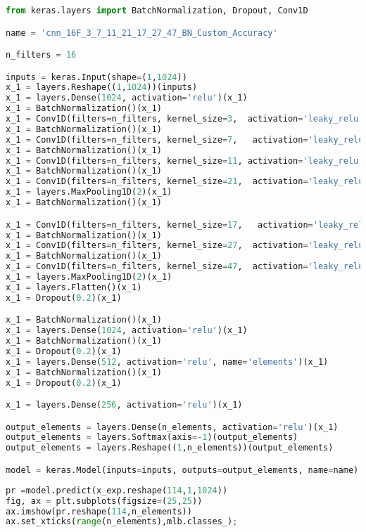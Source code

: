 \begin{lstlisting}[language=Python]
from keras.layers import BatchNormalization, Dropout, Conv1D

name = 'cnn_16F_3_7_11_21_17_27_47_BN_Custom_Accuracy'

n_filters = 16

inputs = keras.Input(shape=(1,1024))
x_1 = layers.Reshape((1,1024))(inputs)
x_1 = layers.Dense(1024, activation='relu')(x_1)
x_1 = BatchNormalization()(x_1)
x_1 = Conv1D(filters=n_filters, kernel_size=3,  activation='leaky_relu', data_format='channels_first')(x_1)
x_1 = BatchNormalization()(x_1)
x_1 = Conv1D(filters=n_filters, kernel_size=7,   activation='leaky_relu', data_format='channels_first')(x_1)
x_1 = BatchNormalization()(x_1)
x_1 = Conv1D(filters=n_filters, kernel_size=11, activation='leaky_relu', data_format='channels_first')(x_1)
x_1 = BatchNormalization()(x_1)
x_1 = Conv1D(filters=n_filters, kernel_size=21,  activation='leaky_relu', data_format='channels_first')(x_1)
x_1 = layers.MaxPooling1D(2)(x_1)
x_1 = BatchNormalization()(x_1)

x_1 = Conv1D(filters=n_filters, kernel_size=17,   activation='leaky_relu', data_format='channels_first')(x_1)
x_1 = BatchNormalization()(x_1)
x_1 = Conv1D(filters=n_filters, kernel_size=27,  activation='leaky_relu', data_format='channels_first')(x_1)
x_1 = BatchNormalization()(x_1)
x_1 = Conv1D(filters=n_filters, kernel_size=47,  activation='leaky_relu', data_format='channels_first')(x_1)
x_1 = layers.MaxPooling1D(2)(x_1)
x_1 = layers.Flatten()(x_1)
x_1 = Dropout(0.2)(x_1)

x_1 = BatchNormalization()(x_1)
x_1 = layers.Dense(1024, activation='relu')(x_1)
x_1 = BatchNormalization()(x_1)
x_1 = Dropout(0.2)(x_1)
x_1 = layers.Dense(512, activation='relu', name='elements')(x_1)
x_1 = BatchNormalization()(x_1)
x_1 = Dropout(0.2)(x_1)

x_1 = layers.Dense(256, activation='relu')(x_1)

output_elements = layers.Dense(n_elements, activation='relu')(x_1)
output_elements = layers.Softmax(axis=-1)(output_elements)
output_elements = layers.Reshape((1,n_elements))(output_elements)

model = keras.Model(inputs=inputs, outputs=output_elements, name=name)
\end{lstlisting}

\begin{lstlisting}[language=Python]
pr =model.predict(x_exp.reshape(114,1,1024))
fig, ax = plt.subplots(figsize=(25,25))
ax.imshow(pr.reshape(114,n_elements))
ax.set_xticks(range(n_elements),mlb.classes_);
\end{lstlisting}

